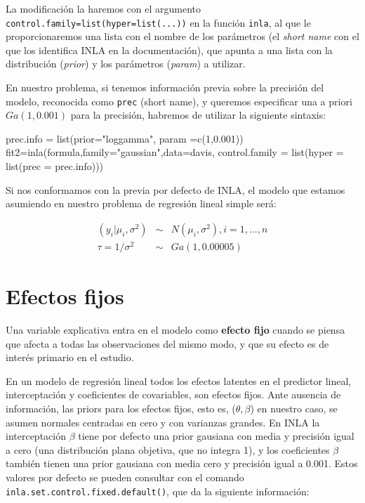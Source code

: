 \documentclass[
]{book}
\newenvironment{Shaded}{\begin{snugshade}}{\end{snugshade}}
\newcommand{\AttributeTok}[1]{\textcolor[rgb]{0.77,0.63,0.00}{#1}}
\newcommand{\DecValTok}[1]{\textcolor[rgb]{0.00,0.00,0.81}{#1}}
\newcommand{\FloatTok}[1]{\textcolor[rgb]{0.00,0.00,0.81}{#1}}
\newcommand{\FunctionTok}[1]{\textcolor[rgb]{0.00,0.00,0.00}{#1}}
\newcommand{\NormalTok}[1]{#1}
\newcommand{\OtherTok}[1]{\textcolor[rgb]{0.56,0.35,0.01}{#1}}
\newcommand{\StringTok}[1]{\textcolor[rgb]{0.31,0.60,0.02}{#1}}
\begin{document}
La modificación la haremos con el argumento \texttt{control.family=list(hyper=list(...))} en la función \texttt{inla}, al que le proporcionaremos una lista con el nombre de los parámetros (el \emph{short name} con el que los identifica INLA en la documentación), que apunta a una lista con la distribución (\emph{prior}) y los parámetros (\emph{param}) a utilizar.

En nuestro problema, si tenemos información previa sobre la precisión del modelo, reconocida como \texttt{prec} (short name), y queremos especificar una a priori \(Ga(1,0.001)\) para la precisión, habremos de utilizar la siguiente sintaxis:

\begin{Shaded}
\begin{Highlighting}[]
\NormalTok{prec.info }\OtherTok{=} \FunctionTok{list}\NormalTok{(}\AttributeTok{prior=}\StringTok{"loggamma"}\NormalTok{, }\AttributeTok{param =}\FunctionTok{c}\NormalTok{(}\DecValTok{1}\NormalTok{,}\FloatTok{0.001}\NormalTok{))}
\NormalTok{fit2}\OtherTok{=}\FunctionTok{inla}\NormalTok{(formula,}\AttributeTok{family=}\StringTok{"gaussian"}\NormalTok{,}\AttributeTok{data=}\NormalTok{davis,}
      \AttributeTok{control.family =} \FunctionTok{list}\NormalTok{(}\AttributeTok{hyper =} \FunctionTok{list}\NormalTok{(}\AttributeTok{prec =}\NormalTok{ prec.info)))}
\end{Highlighting}
\end{Shaded}

Si nos conformamos con la previa por defecto de INLA, el modelo que estamos asumiendo en nuestro problema de regresión lineal simple será:

\begin{eqnarray*}
(y_i|\mu_i,\sigma^2) &\sim & N(\mu_i,\sigma^2), i=1,...,n \\
\tau=1/\sigma^2 & \sim & Ga(1,0.00005)
\end{eqnarray*}

\hypertarget{efectos-fijos}{%
\section{Efectos fijos}\label{efectos-fijos}}

Una variable explicativa entra en el modelo como \textbf{efecto fijo} cuando
se piensa que afecta a todas las observaciones del mismo modo, y que su efecto es de interés primario en el estudio.

En un modelo de regresión lineal todos los efectos latentes en el predictor lineal, interceptación y coeficientes de covariables, son efectos fijos. Ante ausencia de información, las priors para los efectos fijos, esto es, (\(\theta,\beta\)) en nuestro caso, se asumen normales centradas en cero y con varianzas grandes. En INLA la interceptación \(\beta\) tiene por defecto una prior gausiana con media y precisión igual a cero (una distribución plana objetiva, que no integra 1), y los coeficientes \(\beta\) también tienen una prior gausiana con media cero y precisión igual a 0.001. Estos valores por defecto se pueden consultar con el comando \texttt{inla.set.control.fixed.default()}, que da la siguiente información:
\end{document}
